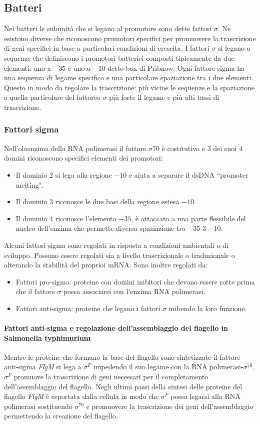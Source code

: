 \subsection{Batteri}
Nei batteri le subunit\`a che si legano al promotore sono dette fattori $\sigma$. Ne esistono diverse che riconoscono promotori specifici per promuovere la trascrizione di geni specifici 
in base a particolari condizioni di crescita. I fattori $\sigma$ si legano a sequenze che definiscono i promotori batterici composti tipicamente da due elementi: uno a $-35$ e uno a
$-10$ detto box di Pribnow. Ogni fattore sigma ha una sequenza di legame specifico e una particolare spaziazione tra i due elementi. Questo in modo da regolare la trascrizione: pi\`u
vicine le sequenze e la spaziazione a quella particolare del fattoreo $\sigma$  pi\`u forte il legame e pi\`u alti tassi di trascrizione. 
\subsubsection{Fattori sigma}
Nell'oloenzima della RNA polimerasi il fattore $\sigma70$ \`e costitutivo e $3$ dei suoi $4$ domini riconoscono specifici elementi dei promotori:
\begin{itemize}
	\item Il dominio $2$ si lega alla regione $-10$ e aiuta a separare il dsDNA ``promoter melting".
	\item Il dominio $3$ riconosce le due basi della regione estesa $-10$.
	\item Il dominio $4$ riconosce l'elemento $-35$, \`e attaccato a una parte flessibile del nucleo dell'enzima che permette diversa spaziazione tra $-35$ 3 $-10$. 
\end{itemize}
Alcuni fattori sigma sono regolati in risposta a condizioni ambientali o di sviluppo. Possono essere regolati sia a livello trascrizionale o traduzionale o alterando la stabilit\`a 
del proprioi mRNA. Sono inoltre regolati da:
\begin{itemize}
	\item Fattori pro-sigma: proteine con domini inibitori che devono essere rotte prima che il fattore $\sigma$ possa associarsi con l'enzima RNA polimerasi. 
	\item Fattori anti-sigma: proteine che legano i fattori $\sigma$ inibendo la loro funzione. 
\end{itemize}
\paragraph{Fattori anti-sigma e regolazione dell'assemblaggio del flagello in Salmonella typhimurium}
Mentre le proteine che formano la base del flagello sono sintetizzate il fattore anti-sigma \emph{FlgM} si lega a $\sigma^F$ impedendo il suo legame con la RNA polimerasi-$\sigma^{70}$. 
$\sigma^F$ promuove la trascrizione di geni necessari per il completamento dell'assemblaggio del flagello. Negli ultimi passi della sintesi delle proteine del flagello \emph{FlgM} 
\`e esportata dalla cellula in modo che $\sigma^F$ possa legarsi alla RNA polimerasi sostituendo $\sigma^{70}$ e promuovere la trascrizione dei geni dell'assemblaggio permettendo
la creazione del flagello. 
